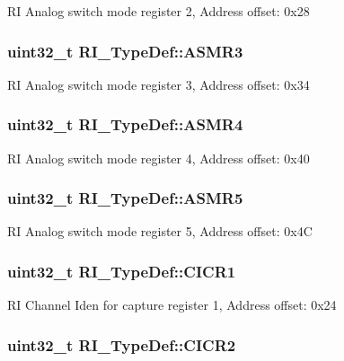 R\-I Analog switch mode register 2, Address offset\-: 0x28 \hypertarget{struct_r_i___type_def_a5a0e73266695441ad0ff3e4c03d4ea1e}{
\subsubsection[{A\-S\-M\-R3}]{ uint32\-\_\-t R\-I\-\_\-\-Type\-Def\-::\-A\-S\-M\-R3}}\label{struct_r_i___type_def_a5a0e73266695441ad0ff3e4c03d4ea1e}
R\-I Analog switch mode register 3, Address offset\-: 0x34 \hypertarget{struct_r_i___type_def_a266d53ada048f0f62a78809fcd63637c}{
\subsubsection[{A\-S\-M\-R4}]{ uint32\-\_\-t R\-I\-\_\-\-Type\-Def\-::\-A\-S\-M\-R4}}\label{struct_r_i___type_def_a266d53ada048f0f62a78809fcd63637c}
R\-I Analog switch mode register 4, Address offset\-: 0x40 \hypertarget{struct_r_i___type_def_addceda51c65c2dd65358b57d2bfe427f}{
\subsubsection[{A\-S\-M\-R5}]{ uint32\-\_\-t R\-I\-\_\-\-Type\-Def\-::\-A\-S\-M\-R5}}\label{struct_r_i___type_def_addceda51c65c2dd65358b57d2bfe427f}
R\-I Analog switch mode register 5, Address offset\-: 0x4\-C \hypertarget{struct_r_i___type_def_adb8dc783b491b761709af5dccadc146c}{
\subsubsection[{C\-I\-C\-R1}]{ uint32\-\_\-t R\-I\-\_\-\-Type\-Def\-::\-C\-I\-C\-R1}}\label{struct_r_i___type_def_adb8dc783b491b761709af5dccadc146c}
R\-I Channel Iden for capture register 1, Address offset\-: 0x24 \hypertarget{struct_r_i___type_def_ab3cf44093000cbee15ecd8a1f4d72a76}{
\subsubsection[{C\-I\-C\-R2}]{ uint32\-\_\-t R\-I\-\_\-\-Type\-Def\-::\-C\-I\-C\-R2}}\label{struct_r_i___type_def_ab3cf44093000cbee15ecd8a1f4d72a76}
